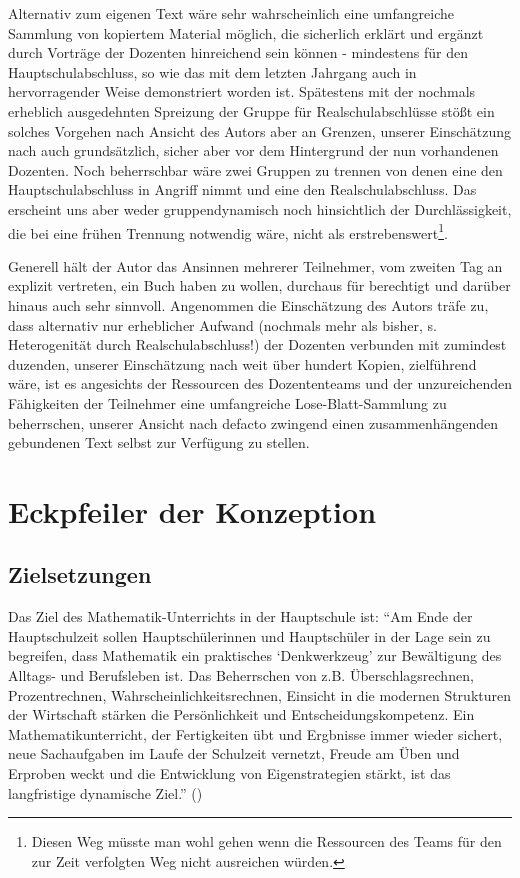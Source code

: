 \documentclass[a4paper]{book}%
\theoremstyle{definition}
\begin{document}
Alternativ zum eigenen Text wäre sehr wahrscheinlich eine umfangreiche Sammlung von kopiertem Material möglich, die sicherlich erklärt und ergänzt durch Vorträge der Dozenten hinreichend sein können - mindestens für den Hauptschulabschluss, so wie das mit dem letzten Jahrgang auch in hervorragender Weise demonstriert worden ist. Spätestens mit der nochmals erheblich ausgedehnten Spreizung der Gruppe für Realschulabschlüsse stößt ein solches Vorgehen nach Ansicht des Autors aber an Grenzen, unserer Einschätzung nach auch grundsätzlich, sicher aber vor dem Hintergrund der nun vorhandenen Dozenten. Noch beherrschbar wäre zwei Gruppen zu trennen von denen eine den Hauptschulabschluss in Angriff nimmt und eine den Realschulabschluss. Das erscheint uns aber weder gruppendynamisch noch hinsichtlich der Durchlässigkeit, die bei eine frühen Trennung notwendig wäre, nicht als erstrebenswert\footnote{Diesen Weg müsste man wohl gehen wenn die Ressourcen des Teams für den zur Zeit verfolgten Weg nicht ausreichen würden.}.

Generell hält der Autor das Ansinnen mehrerer Teilnehmer, vom zweiten Tag an explizit vertreten, ein Buch haben zu wollen, durchaus für berechtigt und darüber hinaus auch sehr sinnvoll. Angenommen die Einschätzung des Autors träfe zu, dass alternativ nur erheblicher Aufwand (nochmals mehr als bisher, s. Heterogenität durch Realschulabschluss!) der Dozenten verbunden mit zumindest duzenden, unserer Einschätzung nach weit über hundert Kopien, zielführend wäre, ist es angesichts der Ressourcen des Dozententeams und der unzureichenden Fähigkeiten der Teilnehmer eine umfangreiche Lose-Blatt-Sammlung zu beherrschen, unserer Ansicht nach defacto zwingend einen zusammenhängenden gebundenen Text selbst zur Verfügung zu stellen.


\chapter{Eckpfeiler der Konzeption}\label{Eckpfeiler}

\section{Zielsetzungen}\label{Konzept:Zielsetzungen}

Das Ziel des Mathematik-Unterrichts in der Hauptschule ist: \enquote{Am Ende der Hauptschulzeit sollen Hauptschülerinnen und Hauptschüler in der Lage sein zu begreifen, dass Mathematik ein praktisches \enquote{Denkwerkzeug} zur Bewältigung des Alltags- und Berufsleben ist. Das Beherrschen von z.B. Überschlagsrechnen, Prozentrechnen, Wahrscheinlichkeitsrechnen, Einsicht in die modernen Strukturen der Wirtschaft stärken die Persönlichkeit und Entscheidungskompetenz. Ein Mathematikunterricht, der Fertigkeiten übt und Ergbnisse immer wieder sichert, neue Sachaufgaben im Laufe der Schulzeit vernetzt, Freude am Üben und Erproben weckt und die Entwicklung von Eigenstrategien stärkt, ist das langfristige dynamische Ziel.} (\citep{LehrplanMathematikHauptschuleHessen2017})
\end{document}
